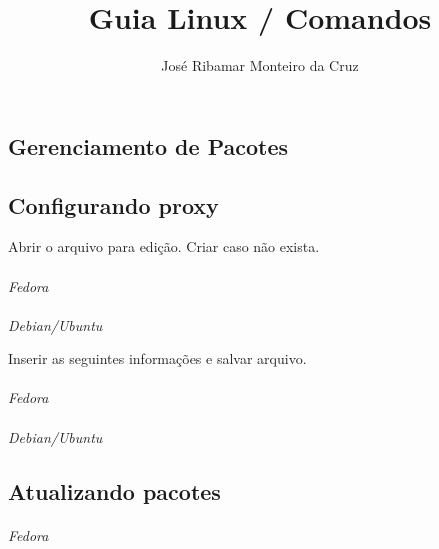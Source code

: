 \documentclass[a4paper,9pt]{extarticle}
\begin{document}
\title{Guia Linux / Comandos}
\author{José Ribamar Monteiro da Cruz}
\maketitle
\tableofcontents



\begin{multicols}{2}
\section{Gerenciamento de Pacotes}
\subsection{Configurando proxy}
	Abrir o arquivo para edição. Criar caso não exista.
	
	\paragraph{} \emph{Fedora}
	
	\paragraph{} \emph{Debian/Ubuntu} \newline
	
	\noindent Inserir as seguintes informações e salvar arquivo.
	
	\paragraph{} \emph{Fedora}

	\paragraph{} \emph{Debian/Ubuntu}
	
	
\subsection{Atualizando pacotes}
	
	\paragraph{} \emph{Fedora}
	

\end{multicols}
\end{document}
